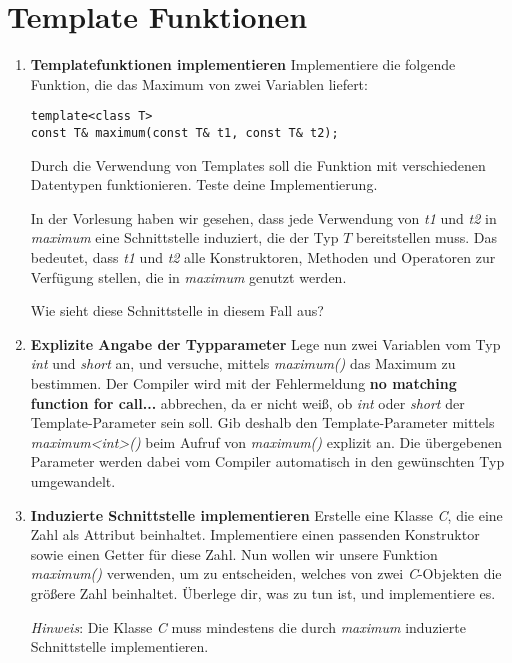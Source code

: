 \section{Template Funktionen}
\begin{enumerate}
\item \textbf{Templatefunktionen implementieren}
Implementiere die folgende Funktion, die das Maximum von zwei Variablen liefert:
\begin{lstlisting}
template<class T>
const T& maximum(const T& t1, const T& t2);
\end{lstlisting}

Durch die Verwendung von Templates soll die Funktion mit verschiedenen Datentypen funktionieren.
Teste deine Implementierung.

In der Vorlesung haben wir gesehen, dass jede Verwendung von \emph{t1} und \emph{t2} in \emph{maximum} eine Schnittstelle induziert, die der Typ $T$ bereitstellen muss.
Das bedeutet, dass \emph{t1} und \emph{t2} alle Konstruktoren, Methoden und Operatoren zur Verfügung stellen, die in \emph{maximum} genutzt werden.

Wie sieht diese Schnittstelle in diesem Fall aus?

\item \textbf{Explizite Angabe der Typparameter}
Lege nun zwei Variablen vom Typ \emph{int} und \emph{short} an, und versuche, mittels \emph{maximum()} das Maximum zu bestimmen.
Der Compiler wird mit der Fehlermeldung \textbf{no matching function for call...} abbrechen, da er nicht weiß, ob \emph{int} oder \emph{short} der Template-Parameter sein soll.
Gib deshalb den Template-Parameter mittels \emph{maximum<int>()} beim Aufruf von \emph{maximum()} explizit an.
Die übergebenen Parameter werden dabei vom Compiler automatisch in den gewünschten Typ umgewandelt.

\item \textbf{Induzierte Schnittstelle implementieren}
Erstelle eine Klasse \emph{C}, die eine Zahl als Attribut beinhaltet. Implementiere einen passenden Konstruktor sowie einen Getter für diese Zahl. Nun wollen wir unsere Funktion  \emph{maximum()} verwenden, um zu entscheiden, welches von zwei \emph{C}-Objekten die größere Zahl beinhaltet.
Überlege dir, was zu tun ist, und implementiere es. 

\emph{Hinweis}: Die Klasse \emph{C} muss mindestens die durch \emph{maximum} induzierte Schnittstelle implementieren.

\end{enumerate}


